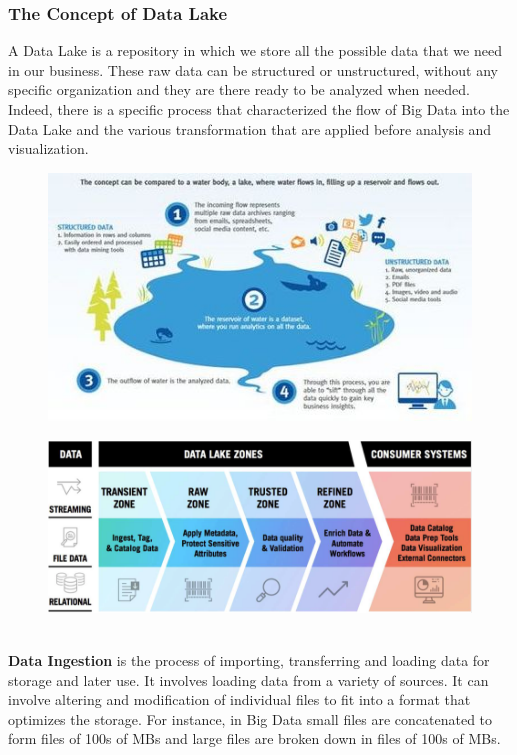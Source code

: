 \documentclass[10pt,a4paper]{article}
\begin{document}
\subsubsection{The Concept of Data Lake}
A Data Lake is a repository in which we store all the possible data that we need in our business. These raw data can be structured or unstructured, without any specific organization and they are there ready to be analyzed when needed. Indeed, there is a specific process that characterized the flow of Big Data into the Data Lake and the various transformation that are applied before analysis and visualization.
\begin{figure}[h!]
\centering
\begin{minipage}{.5\textwidth}
  \centering
  \includegraphics[width=.9\linewidth]{images/data-lake}
  \label{fig:data-lake}
\end{minipage}%
\begin{minipage}{.5\textwidth}
  \centering
  \includegraphics[width=.9\linewidth]{images/data-lake-process}
  \label{fig:data-lake-process}
\end{minipage}
\end{figure}  \\
\textbf{Data Ingestion} is the process of importing, transferring and loading data for storage and later use. It involves loading data from a variety of sources. It can involve altering and modification of individual files to fit into a format that optimizes the storage. For instance, in Big Data small files are concatenated to form files of 100s of MBs and large files are broken down in files of 100s of MBs. \\
\end{document}
